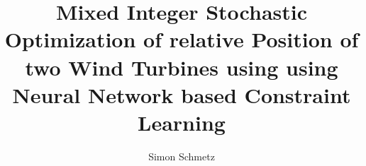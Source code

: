 \documentclass[preprint,12pt]{elsarticle}
\begin{document}
\begin{frontmatter}



\title{Mixed Integer Stochastic Optimization of relative Position of two Wind Turbines using using Neural Network based Constraint Learning} %


\author{Simon Schmetz} %






\end{frontmatter}
\end{document}
